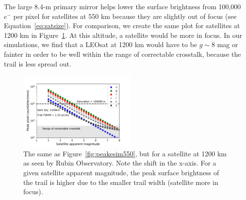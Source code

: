 \documentclass[twocolumn,trackchanges]{aastex63}
\begin{document}

The large 8.4-m primary mirror helps lower the surface brightness from 100,000 $e^-$ per pixel for satellites at 550 km because they are slightly out of focus (see Equation~\ref{eq:satsize}). For comparison, we create the same plot for satellites at 1200 km in Figure~\ref{fig:peaksim1200}. At this altitude, a satellite would be more in focus.
In our simulations, we find that a LEOsat at 1200 km would have to be $g\sim8$ mag or fainter in order to be well within the range of correctable crosstalk, because the trail is less spread out. 

\begin{figure}[ht!]
\includegraphics[width=0.52\textwidth]{Peak_count_by_band_1200km_darkSky.pdf}
\caption{The same as Figure~\ref{fig:peakesim550}, but for a satellite at 1200 km as seen by Rubin Observatory. Note the shift in the x-axis. For a given satellite apparent magnitude, the peak surface brightness of the trail is higher due to the smaller trail width (satellite more in focus). \label{fig:peaksim1200}}
\end{figure}
\end{document}
